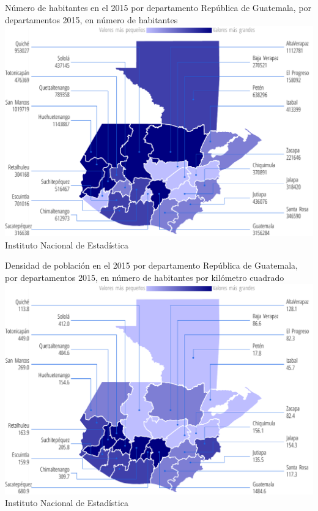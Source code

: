      {%
     }%
     {%
     	Número de habitantes en el 2015 por departamento
     } %
     {%
     	República de Guatemala, por departamentos 2015, en número de habitantes} %
     {%
     	\includegraphics[width=52\cuadri]{graficas/1_02.pdf}}%
     {%
     	Instituto Nacional de Estadística} %
     
     
     
     {%
     }%
     {%
     	Densidad de población en el 2015 por departamento
     } %
     {%
     	República de Guatemala, por departamentos 2015, en número de habitantes por kilómetro cuadrado} %
     {%
     	\includegraphics[width=52\cuadri]{graficas/1_05.pdf}}%
     {%
     	Instituto Nacional de Estadística} %

